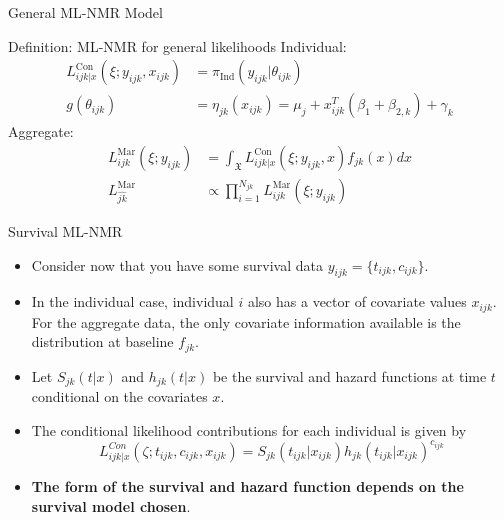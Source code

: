 \documentclass{beamer}
\begin{document}
\begin{frame}{General ML-NMR Model}
    \begin{block}{Definition: ML-NMR for general likelihoods}
    Individual:
    \begin{align}
        L_{ijk|x}^{\text{Con}}(\xi;y_{ijk},x_{ijk}) &= \pi_{\text{Ind}}(y_{ijk}|\theta_{ijk}) \\
        g(\theta_{ijk}) &= \eta_{jk}(x_{ijk}) = \mu_j + x_{ijk}^T(\beta_1 + \beta_{2,k}) + \gamma_k \label{mlnmragg}
    \end{align}
    Aggregate:
    \begin{align}
        L_{ijk}^{\text{Mar}}(\xi; y_{ijk}) &= \int_{\mathfrak{X}} L_{ijk|x}^{\text{Con}}(\xi; y_{ijk}, x)f_{jk}(x)dx \label{mlnnmrint}\\
        L_{\hat{jk}}^{\text{Mar}} &\propto \prod_{i = 1}^{N_{jk}}L_{ijk}^{\text{Mar}}(\xi; y_{ijk})
    \end{align}
    \end{block}
\end{frame}

\begin{frame}{Survival ML-NMR}
    \begin{itemize}
        \item Consider now that you have some survival data $y_{ijk} = \{t_{ijk}, c_{ijk}\}$. 
        \pause
        \item In the individual case, individual $i$ also has a vector of covariate values $x_{ijk}$. For the aggregate data, the only covariate information available is the distribution at baseline $f_{jk}$. 
        \pause 
        \item Let $S_{jk}(t|x)$ and $h_{jk}(t|x)$ be the survival and hazard functions at time $t$ conditional on the covariates $x$. 
        \pause
        \item The conditional likelihood contributions for each individual is given by
        \[L_{ijk|x}^{Con}(\zeta;t_{ijk},c_{ijk},x_{ijk}) = S_{jk}(t_{ijk}| x_{ijk})h_{jk}(t_{ijk}|x_{ijk})^{c_{ijk}}\]
        \pause 
        \item \textbf{The form of the survival and hazard function depends on the survival model chosen}.
    \end{itemize}
\end{frame}
\end{document}
